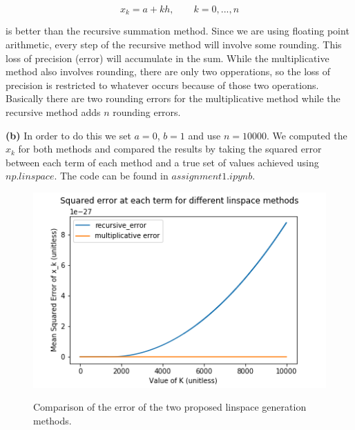 \documentclass{article}
\begin{document}
$$x_k = a + kh, \qquad k=0,...,n$$

is better than the recursive summation method. Since we are using floating point arithmetic, every step of the recursive method will involve some rounding. This loss of precision (error) will accumulate in the sum. While the multiplicative method also involves rounding, there are only two opperations, so the loss of precision is restricted to whatever occurs because of those two operations. Basically there are two rounding errors for the multiplicative method while the recursive method adds $n$ rounding errors.

\textbf{(b)}
In order to do this we set $a=0$, $b=1$ and use $n=10000$. We computed the $x_k$ for both methods and compared the results by taking the squared error between each term of each method and a true set of values achieved using $np.linspace$. The code can be found in $assignment1.ipynb.$\\

\begin{figure}
	\includegraphics[width=\textwidth]{fig_ch1_cp1_6.png}
	\label{fig:ch1_cp1_6}
	\caption{Comparison of the error of the two proposed linspace generation methods.}
\end{figure}
\end{document}
